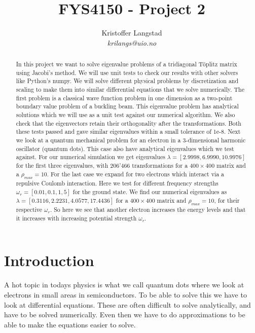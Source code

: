 \documentclass[12pt,a4paper,english]{article}
\title{FYS4150 - Project 2}
\date{}
\author{ Kristoffer Langstad\\ \textit{krilangs@uio.no}}
\begin{document}
\maketitle
\begin{abstract}
In this project we want to solve eigenvalue problems of a tridiagonal Töplitz matrix using Jacobi's method. We will use unit tests to check our results with other solvers like Python's numpy. We will solve different physical problems by discretization and scaling to make them into similar differential equations that we solve numerically. The first problem is a classical wave function problem in one dimension as a two-point boundary value problem of a buckling beam. This eigenvalue problem has analytical solutions which we will use as a unit test against our numerical algorithm. We also check that the eigenvectors retain their orthogonality after the transformations. Both these tests passed and gave similar eigenvalues within a small tolerance of 1e-8. Next we look at a quantum mechanical problem for an electron in a 3-dimensional harmonic oscillator (quantum dots). This case also have analytical eigenvalues which we test against. For our numerical simulation we get eigenvalues $\lambda=[2.9998, 6.9990, 10.9976]$ for the first three eigenvalues, with 206'466 transformations for a $400\times400$ matrix and a $\rho_{max}=10$. For the last case we expand for two electrons which interact via a repulsive Coulomb interaction. Here we test for different frequency strengths $\omega_r=[0.01, 0.1, 1, 5]$ for the ground state. We find our numerical eigenvalues as $\lambda=[0.3116,2.2231, 4.0577,17.4436]$ for a $400\times400$ matrix and $\rho_{max}=10$, for their respective $\omega_r$. So here we see that another electron increases the energy levels and that it increases with increasing potential strength $\omega_r$.%
\end{abstract}

\section{Introduction}
A hot topic in todays physics is what we call quantum dots where we look at electrons in small areas in semiconductors. To be able to solve this we have to look at differential equations. These are often difficult to solve analytically, and have to be solved numerically. Even then we have to do approximations to be able to make the equations easier to solve.
\end{document}
